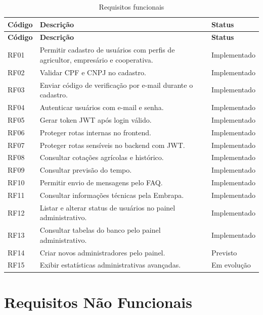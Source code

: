 \documentclass[
  12pt,
  oneside,
  a4paper,
  brazil
]{abntex2}
\begin{document}
\begin{longtable}{@{}p{}p{}p{}@{}}
\caption{Requisitos funcionais}\\
\toprule
\textbf{Código} & \textbf{Descrição} & \textbf{Status} \\
\midrule
\endfirsthead
\toprule
\textbf{Código} & \textbf{Descrição} & \textbf{Status} \\
\midrule
\endhead
RF01 & Permitir cadastro de usuários com perfis de agricultor, empresário e cooperativa. & Implementado \\
RF02 & Validar CPF e CNPJ no cadastro. & Implementado \\
RF03 & Enviar código de verificação por e-mail durante o cadastro. & Implementado \\
RF04 & Autenticar usuários com e-mail e senha. & Implementado \\
RF05 & Gerar token JWT após login válido. & Implementado \\
RF06 & Proteger rotas internas no frontend. & Implementado \\
RF07 & Proteger rotas sensíveis no backend com JWT. & Implementado \\
RF08 & Consultar cotações agrícolas e histórico. & Implementado \\
RF09 & Consultar previsão do tempo. & Implementado \\
RF10 & Permitir envio de mensagens pelo FAQ. & Implementado \\
RF11 & Consultar informações técnicas pela Embrapa. & Implementado \\
RF12 & Listar e alterar status de usuários no painel administrativo. & Implementado \\
RF13 & Consultar tabelas do banco pelo painel administrativo. & Implementado \\
RF14 & Criar novos administradores pelo painel. & Previsto \\
RF15 & Exibir estatísticas administrativas avançadas. & Em evolução \\
\bottomrule
\end{longtable}

\section{Requisitos Não Funcionais}
\end{document}
